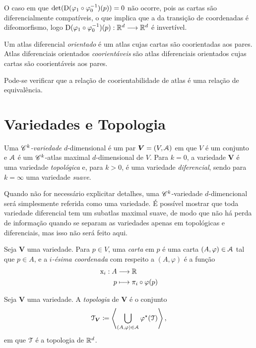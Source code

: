 O caso em que $\det(\mathrm{D}(\varphi_1 \circ \varphi_0^{-1})(p))=0$ não ocorre, pois as cartas são diferencialmente compatíveis, o que implica que a da transição de coordenadas é difeomorfismo, logo $\mathrm{D}(\varphi_1 \circ \varphi_0^{-1})(p): \mathbb{R}^d \longrightarrow \mathbb{R}^d$ é invertível.

\begin{defi}
Um atlas diferencial \emph{orientado} é um atlas cujas cartas são coorientadas aos pares. Atlas diferenciais orientados \emph{coorientáveis} são atlas diferenciais orientados cujas cartas são coorientáveis aos pares.
\end{defi}

Pode-se verificar que a relação de coorientabilidade de atlas é uma relação de equivalência.

\section{Variedades e Topologia}

\begin{defi}
Uma \emph{$\mathscr{C}^k$-variedade} $d$-dimensional é um par $\bm V=(V,\mathcal{A})$ em que $V$ é um conjunto e $\mathcal{A}$ é um $\mathscr{C}^k$-atlas maximal $d$-dimensional de $V$. Para $k=0$, a variedade $\bm V$ é uma variedade \emph{topológica} e, para $k>0$, é uma variedade \emph{diferencial}, sendo para $k=\infty$ uma variedade \emph{suave}.
\end{defi}

Quando não for necessário explicitar detalhes, uma $\mathscr{C}^k$-variedade $d$-dimencional será simplesmente referida como uma variedade. É possível mostrar que toda variedade diferencial tem um subatlas maximal suave, de modo que não há perda de informação quando se separam as variedades apenas em topológicas e diferenciais, mas isso não será feito aqui.

\begin{defi}
Seja $\bm V$ uma variedade. Para $p \in V$, uma \emph{carta} em $p$ é uma carta $(A,\varphi) \in \mathcal{A}$ tal que $p \in A$, e a \emph{$i$-ésima coordenada} com respeito a $(A,\varphi)$ é a função
	\begin{align*}
	{\mathrm{x}_i}: {A} &\longrightarrow {\mathbb{R}} \\{p} &\longmapsto {\pi_i \circ \varphi(p)}
	\end{align*}
\end{defi}

\begin{defi}
Seja $\bm V$ uma variedade. A \emph{topologia} de $\bm V$ é o conjunto
	\begin{equation*}
	\mathcal{T}_{\bm V} \coloneqq \left\langle \bigcup_{(A,\varphi) \in \mathcal{A}} \varphi^\star(\mathcal{T}) \right\rangle,
	\end{equation*}
em que $\mathcal{T}$ é a topologia de $\mathbb{R}^d$.
\end{defi}

